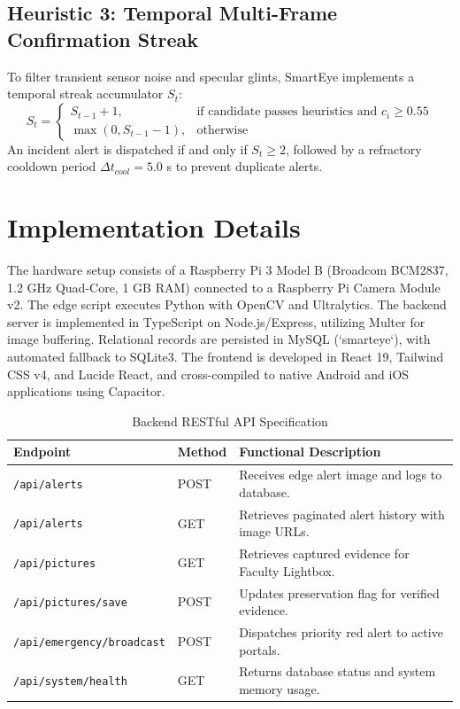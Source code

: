\documentclass[conference]{IEEEtran}
\begin{document}
\subsection{Heuristic 3: Temporal Multi-Frame Confirmation Streak}
To filter transient sensor noise and specular glints, SmartEye implements a temporal streak accumulator $S_t$:
\begin{equation}
S_t = \begin{cases} S_{t-1} + 1, & \text{if candidate passes heuristics and } c_i \ge 0.55 \\ \max(0, S_{t-1} - 1), & \text{otherwise} \end{cases}
\end{equation}
An incident alert is dispatched if and only if $S_t \ge 2$, followed by a refractory cooldown period $\Delta t_{cool} = 5.0$ s to prevent duplicate alerts.

\section{Implementation Details}
The hardware setup consists of a Raspberry Pi 3 Model B (Broadcom BCM2837, 1.2 GHz Quad-Core, 1 GB RAM) connected to a Raspberry Pi Camera Module v2. The edge script executes Python with OpenCV and Ultralytics. The backend server is implemented in TypeScript on Node.js/Express, utilizing Multer for image buffering. Relational records are persisted in MySQL (`smarteye`), with automated fallback to SQLite3. The frontend is developed in React 19, Tailwind CSS v4, and Lucide React, and cross-compiled to native Android and iOS applications using Capacitor.

\begin{table}[h]
\caption{Backend RESTful API Specification}
\label{tab:api}
\centering
\begin{tabular}{@{}lll@{}}
\toprule
\textbf{Endpoint} & \textbf{Method} & \textbf{Functional Description} \\ \midrule
\texttt{/api/alerts} & POST & Receives edge alert image and logs to database. \\
\texttt{/api/alerts} & GET & Retrieves paginated alert history with image URLs. \\
\texttt{/api/pictures} & GET & Retrieves captured evidence for Faculty Lightbox. \\
\texttt{/api/pictures/save} & POST & Updates preservation flag for verified evidence. \\
\texttt{/api/emergency/broadcast} & POST & Dispatches priority red alert to active portals. \\
\texttt{/api/system/health} & GET & Returns database status and system memory usage. \\ \bottomrule
\end{tabular}
\end{table}
\end{document}
